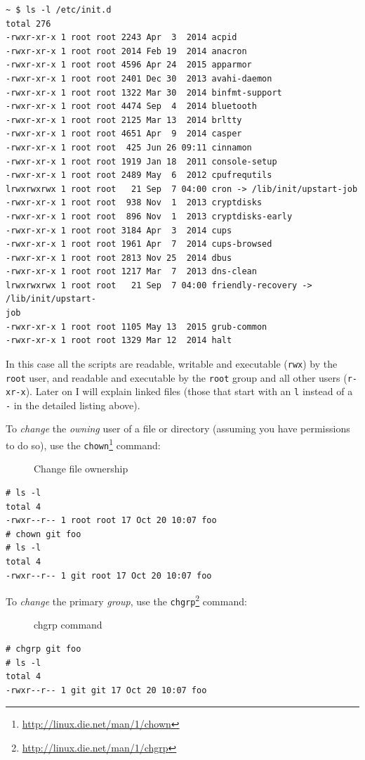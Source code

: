 \documentclass[10pt,]{book}
\renewcommand{\href}[2]{#2\footnote{\url{#1}}}
\numberwithin{figure}{chapter}
\DeclareRobustCommand{\drcap}[1]{\begin{figure}[H]\caption{#1}\end{figure}}
\DeclareRobustCommand{\drcmd}[1]{\index{Commands!#1}}
\begin{document}
\begin{verbatim}
~ $ ls -l /etc/init.d
total 276
-rwxr-xr-x 1 root root 2243 Apr  3  2014 acpid
-rwxr-xr-x 1 root root 2014 Feb 19  2014 anacron
-rwxr-xr-x 1 root root 4596 Apr 24  2015 apparmor
-rwxr-xr-x 1 root root 2401 Dec 30  2013 avahi-daemon
-rwxr-xr-x 1 root root 1322 Mar 30  2014 binfmt-support
-rwxr-xr-x 1 root root 4474 Sep  4  2014 bluetooth
-rwxr-xr-x 1 root root 2125 Mar 13  2014 brltty
-rwxr-xr-x 1 root root 4651 Apr  9  2014 casper
-rwxr-xr-x 1 root root  425 Jun 26 09:11 cinnamon
-rwxr-xr-x 1 root root 1919 Jan 18  2011 console-setup
-rwxr-xr-x 1 root root 2489 May  6  2012 cpufrequtils
lrwxrwxrwx 1 root root   21 Sep  7 04:00 cron -> /lib/init/upstart-job
-rwxr-xr-x 1 root root  938 Nov  1  2013 cryptdisks
-rwxr-xr-x 1 root root  896 Nov  1  2013 cryptdisks-early
-rwxr-xr-x 1 root root 3184 Apr  3  2014 cups
-rwxr-xr-x 1 root root 1961 Apr  7  2014 cups-browsed
-rwxr-xr-x 1 root root 2813 Nov 25  2014 dbus
-rwxr-xr-x 1 root root 1217 Mar  7  2013 dns-clean
lrwxrwxrwx 1 root root   21 Sep  7 04:00 friendly-recovery -> /lib/init/upstart-
job
-rwxr-xr-x 1 root root 1105 May 13  2015 grub-common
-rwxr-xr-x 1 root root 1329 Mar 12  2014 halt
\end{verbatim}

In this case all the scripts are readable, writable and executable
(\texttt{rwx}) by the \texttt{root} user, and readable and executable by
the \texttt{root} group and all other users (\texttt{r-xr-x}). Later on
I will explain linked files (those that start with an \texttt{l} instead
of a \texttt{-} in the detailed listing above).

To \emph{change} the \emph{owning} user of a file or directory (assuming
you have permissions to do so), use the
\href{http://linux.die.net/man/1/chown}{\texttt{chown}}\drcmd{chown}
command:

\drcap{Change file ownership}

\begin{verbatim}
# ls -l
total 4
-rwxr--r-- 1 root root 17 Oct 20 10:07 foo
# chown git foo
# ls -l
total 4
-rwxr--r-- 1 git root 17 Oct 20 10:07 foo
\end{verbatim}

To \emph{change} the primary \emph{group}, use the
\href{http://linux.die.net/man/1/chgrp}{\texttt{chgrp}}\drcmd{chgrp}
command:

\drcap{chgrp command}

\begin{verbatim}
# chgrp git foo
# ls -l
total 4
-rwxr--r-- 1 git git 17 Oct 20 10:07 foo
\end{verbatim}
\end{document}
